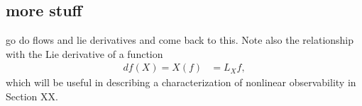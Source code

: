 

\subsection{more stuff}
{\color{red}go do flows and lie derivatives and come back to this.} Note also the relationship with the Lie derivative of a function 
\begin{align}\label{eq:dfX_LXf}
df(X) = X(f) &={} L_Xf,
\end{align}
{\color{red}which will be useful in describing a characterization of nonlinear observability in Section XX.}

